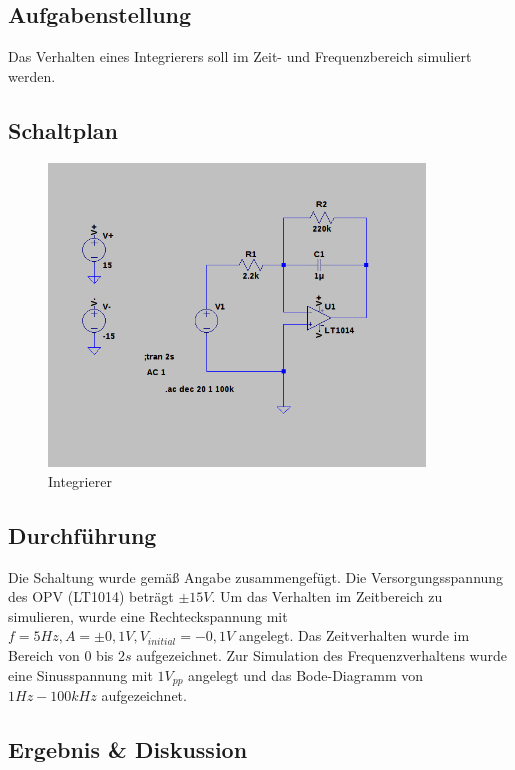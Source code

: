 \documentclass[12pt,a4paper,titlepage]{article}
\begin{document}
\subsection{Aufgabenstellung}
Das Verhalten eines Integrierers soll im Zeit- und Frequenzbereich simuliert werden.

\subsection{Schaltplan}
\begin{figure}[H]
  \centering
  \includegraphics[width=100mm]{integrierer_schaltung.png}
  \caption{Integrierer}
\end{figure}

\subsection{Durchf\"uhrung}
Die Schaltung wurde gem\"aß Angabe zusammengef\"ugt. Die Versorgungsspannung des OPV (LT1014) betr\"agt $\pm 15V$. Um das Verhalten im Zeitbereich zu simulieren, wurde eine Rechteckspannung mit $f=5Hz, A=\pm 0,1V, V_{initial}=-0,1V$ angelegt. Das Zeitverhalten wurde im Bereich von $0$ bis $2s$ aufgezeichnet. Zur Simulation des Frequenzverhaltens wurde eine Sinusspannung mit $1V_{pp}$ angelegt und das Bode-Diagramm von $1Hz-100kHz$ aufgezeichnet.

\subsection{Ergebnis \& Diskussion}
\end{document}
